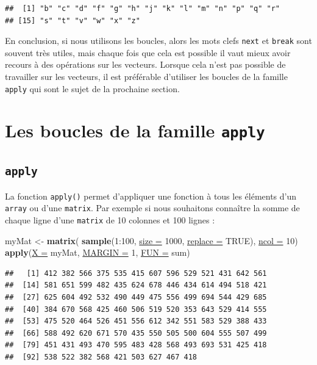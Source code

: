 \documentclass[twoside,symmetric]{book}
\newenvironment{Shaded}{}{}
\newcommand{\DataTypeTok}[1]{\underline{#1}}
\newcommand{\DecValTok}[1]{#1}
\newcommand{\KeywordTok}[1]{\textbf{#1}}
\newcommand{\NormalTok}[1]{#1}
\newcommand{\OperatorTok}[1]{#1}
\newcommand{\OtherTok}[1]{#1}
\newcommand{\StringTok}[1]{#1}
\begin{document}
\begin{verbatim}
##  [1] "b" "c" "d" "f" "g" "h" "j" "k" "l" "m" "n" "p" "q" "r"
## [15] "s" "t" "v" "w" "x" "z"
\end{verbatim}

En conclusion, si nous utilisons les boucles, alors les mots clefs \texttt{next} et \texttt{break} sont souvent très utiles, mais chaque fois que cela est possible il vaut mieux avoir recours à des opérations sur les vecteurs. Lorsque cela n'est pas possible de travailler sur les vecteurs, il est préférable d'utiliser les boucles de la famille \texttt{apply} qui sont le sujet de la prochaine section.

\hypertarget{l17applyfamily}{%
\section{\texorpdfstring{Les boucles de la famille \texttt{apply}}{Les boucles de la famille apply}}\label{l17applyfamily}}

\hypertarget{l17apply}{%
\subsection{\texorpdfstring{\texttt{apply}}{apply}}\label{l17apply}}

La fonction \texttt{apply()} permet d'appliquer une fonction à tous les éléments d'un \texttt{array} ou d'une \texttt{matrix}. Par exemple si nous souhaitons connaître la somme de chaque ligne d'une \texttt{matrix} de 10 colonnes et 100 lignes :

\begin{Shaded}
\begin{Highlighting}[]
\NormalTok{myMat <-}\StringTok{ }\KeywordTok{matrix}\NormalTok{(}
  \KeywordTok{sample}\NormalTok{(}\DecValTok{1}\OperatorTok{:}\DecValTok{100}\NormalTok{, }\DataTypeTok{size =} \DecValTok{1000}\NormalTok{, }\DataTypeTok{replace =} \OtherTok{TRUE}\NormalTok{), }
  \DataTypeTok{ncol =} \DecValTok{10}\NormalTok{)}
\KeywordTok{apply}\NormalTok{(}\DataTypeTok{X =}\NormalTok{ myMat, }\DataTypeTok{MARGIN =} \DecValTok{1}\NormalTok{, }\DataTypeTok{FUN =}\NormalTok{ sum)}
\end{Highlighting}
\end{Shaded}

\begin{verbatim}
##   [1] 412 382 566 375 535 415 607 596 529 521 431 642 561
##  [14] 581 651 599 482 435 624 678 446 434 614 494 518 421
##  [27] 625 604 492 532 490 449 475 556 499 694 544 429 685
##  [40] 384 670 568 425 460 506 519 520 353 643 529 414 555
##  [53] 475 520 464 526 451 556 612 342 551 583 529 388 433
##  [66] 588 492 620 671 570 435 550 505 500 604 555 507 499
##  [79] 451 431 493 470 595 483 428 568 493 693 531 425 418
##  [92] 538 522 382 568 421 503 627 467 418
\end{verbatim}
\end{document}
